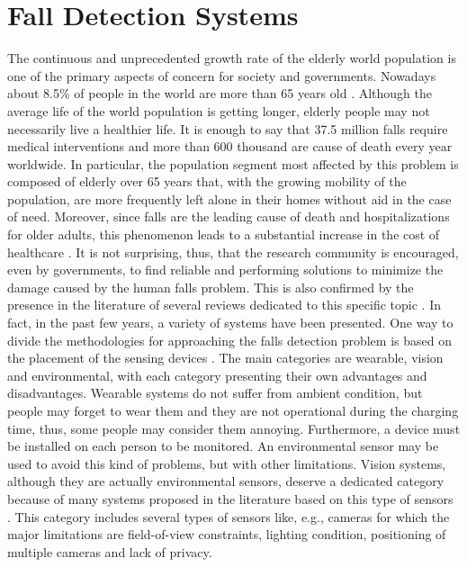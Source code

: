 \section{Fall Detection Systems}
\label{sec:fds}
The continuous and unprecedented growth rate of the elderly world population is one of the primary aspects of concern for society and governments. Nowadays about 8.5\% of people in the world are more than 65 years old \cite{dhhsOlderPop,Carone2006}. Although the average life of the world population is getting longer, elderly people may not    necessarily live a healthier life. It is enough to say that 37.5 million falls require medical interventions and more than 600 thousand are cause of death every year worldwide. In particular, the population segment most affected by this problem is composed of elderly over 65 years that, with the growing mobility of the population, are more frequently left alone in their homes without aid in the case of need. Moreover, since falls are the leading cause of death and hospitalizations for older adults, this phenomenon leads to a substantial increase in the cost of healthcare \cite{whoFall, mubashir2013survey}. 
It is not surprising, thus, that the research community is encouraged, even by governments, to find reliable and performing solutions to minimize the damage caused by the human falls problem. This is also confirmed by the presence in the literature of several reviews dedicated to this specific topic \cite{mubashir2013survey, khan2017review, lapierre2017state, pannurat2014automatic, xu2018new, el2013fall}.
In fact, in the past few years, a variety of systems have been presented. One way to divide the methodologies for approaching the falls detection problem is based on the placement of the sensing devices \cite{mubashir2013survey}. The main categories are wearable, vision and environmental, with each category presenting their own advantages and disadvantages. Wearable systems do not suffer from ambient condition, but people may forget to wear them and they are not operational during the charging time, thus, some people may consider them annoying. Furthermore, a device must be installed on each person to be monitored. An environmental sensor may be used to avoid this kind of problems, but with other limitations. Vision systems, although they are actually environmental sensors, deserve a dedicated category because of many systems proposed in the literature based on this type of sensors \cite{mubashir2013survey}. This category includes several types of sensors like, e.g., cameras for which the major limitations are field-of-view constraints, lighting condition, positioning of multiple cameras and lack of privacy.
